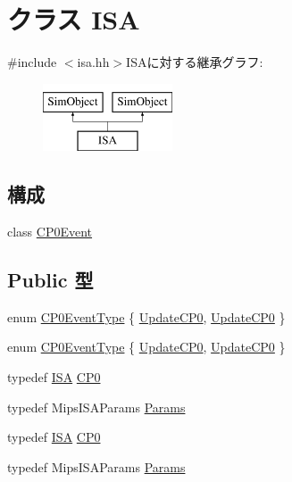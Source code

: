 \hypertarget{classMipsISA_1_1ISA}{
\section{クラス ISA}
\label{classMipsISA_1_1ISA}
}


{\ttfamily \#include $<$isa.hh$>$}ISAに対する継承グラフ:\begin{figure}[H]
\begin{center}
\leavevmode
\includegraphics[height=2cm]{classMipsISA_1_1ISA}
\end{center}
\end{figure}
\subsection*{構成}
\begin{DoxyCompactItemize}
\item 
class \hyperlink{classMipsISA_1_1ISA_1_1CP0Event}{CP0Event}
\end{DoxyCompactItemize}
\subsection*{Public 型}
\begin{DoxyCompactItemize}
\item 
enum \hyperlink{classMipsISA_1_1ISA_a7b22e0667d062181e0dcaa5cf0e66ba7}{CP0EventType} \{ \hyperlink{classMipsISA_1_1ISA_a7b22e0667d062181e0dcaa5cf0e66ba7a40440d4260dd362173f74b5c01c3f047}{UpdateCP0}, 
\hyperlink{classMipsISA_1_1ISA_a7b22e0667d062181e0dcaa5cf0e66ba7a40440d4260dd362173f74b5c01c3f047}{UpdateCP0}
 \}
\item 
enum \hyperlink{classMipsISA_1_1ISA_a7b22e0667d062181e0dcaa5cf0e66ba7}{CP0EventType} \{ \hyperlink{classMipsISA_1_1ISA_a7b22e0667d062181e0dcaa5cf0e66ba7a40440d4260dd362173f74b5c01c3f047}{UpdateCP0}, 
\hyperlink{classMipsISA_1_1ISA_a7b22e0667d062181e0dcaa5cf0e66ba7a40440d4260dd362173f74b5c01c3f047}{UpdateCP0}
 \}
\item 
typedef \hyperlink{classMipsISA_1_1ISA}{ISA} \hyperlink{classMipsISA_1_1ISA_a21db2c38ad074e55f2b584fb5a5d37f3}{CP0}
\item 
typedef MipsISAParams \hyperlink{classMipsISA_1_1ISA_a356644158667486a7a343f11512e4dc7}{Params}
\item 
typedef \hyperlink{classMipsISA_1_1ISA}{ISA} \hyperlink{classMipsISA_1_1ISA_a21db2c38ad074e55f2b584fb5a5d37f3}{CP0}
\item 
typedef MipsISAParams \hyperlink{classMipsISA_1_1ISA_a356644158667486a7a343f11512e4dc7}{Params}
\end{DoxyCompactItemize}
